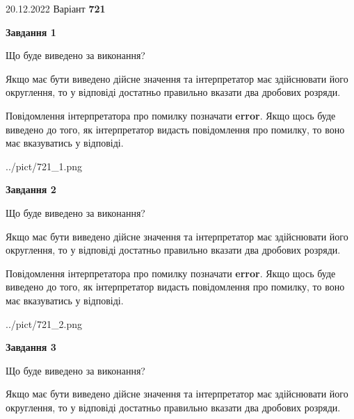 \documentclass[12pt, ukrainian]{article}
\begin{document}
{20.12.2022 Варіант \No \textbf { 721 }\par}
{
\begin {Large}

{\begin {center}\textbf{Завдання 1}\end {center}}\par
Що буде виведено за виконання? \par

Якщо має бути виведено дійсне значення та інтерпретатор має здійснювати його округлення, 
то у відповіді достатньо правильно вказати два дробових розряди.

Повідомлення інтерпретатора про помилку позначати \textbf{error}.
Якщо щось буде виведено до того, як інтерпретатор видасть повідомлення про помилку, 
то воно має вказуватись у відповіді. \par

\begin{center}
	{../pict/721_1.png}
\end{center}
\newpage

{\begin {center}\textbf{Завдання 2}\end {center}}\par
Що буде виведено за виконання? \par

Якщо має бути виведено дійсне значення та інтерпретатор має здійснювати його округлення, 
то у відповіді достатньо правильно вказати два дробових розряди.

Повідомлення інтерпретатора про помилку позначати \textbf{error}.
Якщо щось буде виведено до того, як інтерпретатор видасть повідомлення про помилку, 
то воно має вказуватись у відповіді. \par

\begin{center}
	{../pict/721_2.png}
\end{center}
\newpage

{\begin {center}\textbf{Завдання 3}\end {center}}\par
Що буде виведено за виконання? \par

Якщо має бути виведено дійсне значення та інтерпретатор має здійснювати його округлення, 
то у відповіді достатньо правильно вказати два дробових розряди.


\end{Large}}
\end{document}
